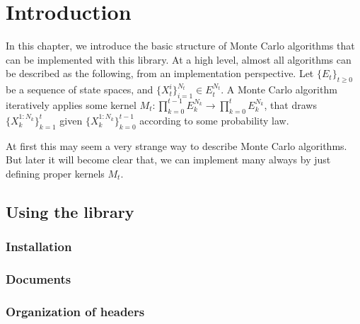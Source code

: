 \chapter{Introduction}
\label{chap:Introduction}

In this chapter, we introduce the basic structure of Monte Carlo algorithms
that can be implemented with this library. At a high level, almost all
algorithms can be described as the following, from an implementation
perspective. Let $\{E_t\}_{t\ge0}$ be a sequence of state spaces, and
$\{X_t^i\}_{i=1}^{N_t} \in E_t^{N_t}$. A Monte Carlo algorithm iteratively
applies some kernel $M_t:\prod_{k=0}^{t-1}E_k^{N_k}\to\prod_{k=0}^tE_k^{N_k}$,
that draws $\{X_k^{1:N_k}\}_{k=1}^t$ given $\{X_k^{1:N_k}\}_{k=0}^{t-1}$
according to some probability law.

At first this may seem a very strange way to describe Monte Carlo algorithms.
But later it will become clear that, we can implement many always by just
defining proper kernels $M_t$.

\section{Using the library}
\label{sec:Using the library}

\subsection{Installation}
\label{sub:Installation}

\subsection{Documents}
\label{sub:Documents}

\subsection{Organization of headers}
\label{sub:Organization of headers}

